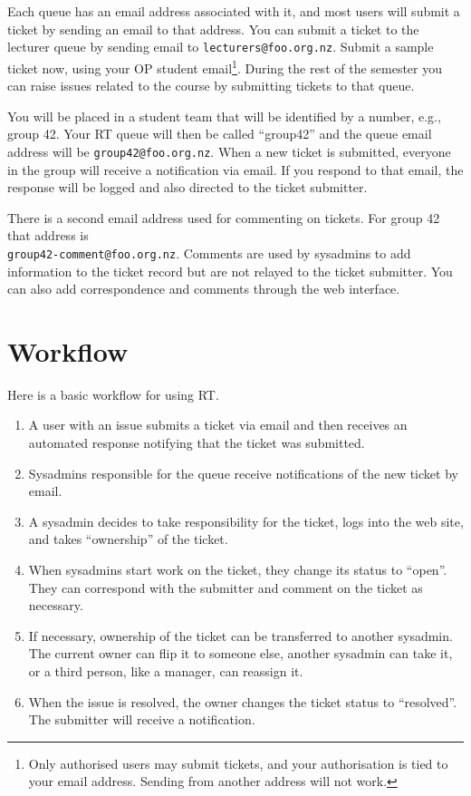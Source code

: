 \documentclass{article}
\begin{document}
Each queue has an email address associated with it, and most users will submit a ticket by sending an email to that address. You can submit a ticket to the lecturer queue by sending email to \texttt{lecturers@foo.org.nz}. Submit a sample ticket now, using your OP student email\footnote{Only authorised users may submit tickets, and your authorisation is tied to your email address. Sending from another address will not work.}. During the rest of the semester you can raise issues related to the course by submitting tickets to that queue.

You will be placed in a student team that will be identified by a number, e.g., group 42. Your RT queue will then be called ``group42'' and the queue email address will be \texttt{group42@foo.org.nz}. When a new ticket is submitted, everyone in the group will receive a notification via email. If you respond to that email, the response will be logged and also directed to the ticket submitter.

There is a second email address used for commenting on tickets. For group 42 that address is \\ \texttt{group42-comment@foo.org.nz}. Comments are used by sysadmins to add information to the ticket record but are not relayed to the ticket submitter. You can also add correspondence and comments through the web interface.

\section{Workflow}
Here is a basic workflow for using RT.

\begin{enumerate}
  \item A user with an issue submits a ticket via email and then receives an automated response notifying that the ticket was submitted.
  \item Sysadmins responsible for the queue receive notifications of the new ticket by email.
  
  \item A sysadmin decides to take responsibility for the ticket, logs into the web site, and takes ``ownership'' of the ticket.
  \item When sysadmins start work on the ticket, they change its status to ``open''. They can correspond with the submitter and comment on the ticket as necessary.
  \item If necessary, ownership of the ticket can be transferred to another sysadmin. The current owner can flip it to someone else, another sysadmin can take it, or a third person, like a manager, can reassign it.
  \item When the issue is resolved, the owner changes the ticket status to ``resolved''. The submitter will receive a notification.
\end{enumerate}
\end{document}
